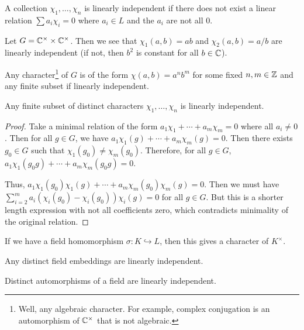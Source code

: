 \message{ !name(notes.tex)}\documentclass[10pt, twoside]{article}
\begin{document}
    \begin{defn}
        A collection $\chi_1, \ldots, \chi_n$ is linearly independent if there does not exist a linear relation $\sum a_i \chi_i = 0$ where $a_i \in L$ and the $a_i$ are not all $0$.
    \end{defn}

    \begin{exm}
        Let $G = \mathbb{C}^{\times} \times \mathbb{C}^{\times}$. Then we see that $\chi_1(a,b) = ab$ and $\chi_2(a,b) = a/b$ are linearly independent (if not, then $b^2$ is constant for all $b \in \mathbb{C}$).
    \end{exm}

    \begin{rmk}
        Any character\footnote{Well, any algebraic character. For example, complex conjugation is an automorphism of $\mathbb{C}^{\times}$ that is not algebraic.} of $G$ is of the form $\chi(a,b) = a^nb^m$ for some fixed $n,m \in \mathbb{Z}$ and any finite subset if linearly independent.
    \end{rmk}

    \begin{thm}
        Any finite subset of distinct characters $\chi_1, \ldots, \chi_n$ is linearly independent.
        \begin{proof}
            Take a minimal relation of the form $a_1 \chi_1 + \cdots + a_m\chi_m = 0$ where all $a_i \neq 0$. Then for all $g \in G$, we have $a_1\chi_1(g) + \cdots + a_m\chi_m(g) = 0$. Then there exists $g_0 \in G$ such that $\chi_1(g_0) \neq \chi_m(g_0)$. Therefore, for all $g \in G$, $a_1\chi_1(g_0g) + \cdots + a_m\chi_m(g_0g) = 0$.

            Thus, $a_1\chi_1(g_0)\chi_1(g) + \cdots + a_m\chi_m(g_0)\chi_m(g) = 0$. Then we must have $\sum_{i=2}^m a_i(\chi_i(g_0) - \chi_i(g_0))\chi_i(g) = 0$ for all $g\in G$. But this is a shorter length expression with not all coefficients zero, which contradicts minimality of the original relation.
        \end{proof}
    \end{thm}

    If we have a field homomorphism $\sigma: K \hookrightarrow L$, then this gives a character of $K^{\times}$.

    \begin{cor}
        Any distinct field embeddings are linearly independent.
    \end{cor}

    \begin{cor}
        Distinct automorphisms of a field are linearly independent.
    \end{cor}
\end{document}
